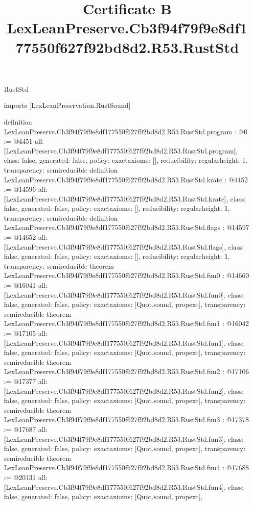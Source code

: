 \begin{lexlean}{RustStd}
\title{Certificate B LexLeanPreserve.Cb3f94f79f9e8df177550f627f92bd8d2.R53.RustStd}
\begin{coremodule}
imports [LexLeanPreservation.RustSound]

definition LexLeanPreserve.Cb3f94f79f9e8df177550f627f92bd8d2.R53.RustStd.program : @0 := @4451 {
  all: [LexLeanPreserve.Cb3f94f79f9e8df177550f627f92bd8d2.R53.RustStd.program],
  class: false,
  generated: false,
  policy: exact{axioms: []},
  reducibility: regular{height: 1},
  transparency: semireducible
}
definition LexLeanPreserve.Cb3f94f79f9e8df177550f627f92bd8d2.R53.RustStd.krate : @4452 := @14596 {
  all: [LexLeanPreserve.Cb3f94f79f9e8df177550f627f92bd8d2.R53.RustStd.krate],
  class: false,
  generated: false,
  policy: exact{axioms: []},
  reducibility: regular{height: 1},
  transparency: semireducible
}
definition LexLeanPreserve.Cb3f94f79f9e8df177550f627f92bd8d2.R53.RustStd.flags : @14597 := @14652 {
  all: [LexLeanPreserve.Cb3f94f79f9e8df177550f627f92bd8d2.R53.RustStd.flags],
  class: false,
  generated: false,
  policy: exact{axioms: []},
  reducibility: regular{height: 1},
  transparency: semireducible
}
theorem LexLeanPreserve.Cb3f94f79f9e8df177550f627f92bd8d2.R53.RustStd.fun0 : @14660 := @16041 {
  all: [LexLeanPreserve.Cb3f94f79f9e8df177550f627f92bd8d2.R53.RustStd.fun0],
  class: false,
  generated: false,
  policy: exact{axioms: [Quot.sound, propext]},
  transparency: semireducible
}
theorem LexLeanPreserve.Cb3f94f79f9e8df177550f627f92bd8d2.R53.RustStd.fun1 : @16042 := @17105 {
  all: [LexLeanPreserve.Cb3f94f79f9e8df177550f627f92bd8d2.R53.RustStd.fun1],
  class: false,
  generated: false,
  policy: exact{axioms: [Quot.sound, propext]},
  transparency: semireducible
}
theorem LexLeanPreserve.Cb3f94f79f9e8df177550f627f92bd8d2.R53.RustStd.fun2 : @17106 := @17377 {
  all: [LexLeanPreserve.Cb3f94f79f9e8df177550f627f92bd8d2.R53.RustStd.fun2],
  class: false,
  generated: false,
  policy: exact{axioms: [Quot.sound, propext]},
  transparency: semireducible
}
theorem LexLeanPreserve.Cb3f94f79f9e8df177550f627f92bd8d2.R53.RustStd.fun3 : @17378 := @17687 {
  all: [LexLeanPreserve.Cb3f94f79f9e8df177550f627f92bd8d2.R53.RustStd.fun3],
  class: false,
  generated: false,
  policy: exact{axioms: [Quot.sound, propext]},
  transparency: semireducible
}
theorem LexLeanPreserve.Cb3f94f79f9e8df177550f627f92bd8d2.R53.RustStd.fun4 : @17688 := @20131 {
  all: [LexLeanPreserve.Cb3f94f79f9e8df177550f627f92bd8d2.R53.RustStd.fun4],
  class: false,
  generated: false,
  policy: exact{axioms: [Quot.sound, propext]},
}
\end{coremodule}
\end{lexlean}
